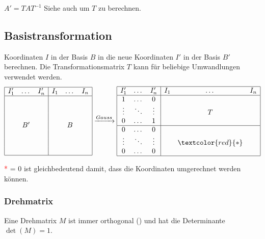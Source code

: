 \noindent $A' = TAT^{-1}$ Siehe auch  um $T$ zu berechnen. 

\subsection{Basistransformation}\label{basistransformation}
\noindent Koordinaten $I$ in der Basis $B$ in die neue Koordinaten $I'$ in der Basis $B'$ berechnen. Die Transformationsmatrix $T$ kann für beliebige Umwandlungen verwendet werden.
\[
\begin{array}{|ccc|ccc|}
	\hline
	I'_1 & \dots & I'_n & I_1 & \dots & I_n \\
	\hline
	& & & & &\\
	& & & & &\\
	& & & & &\\
	& B' & & & B &\\
	& & & & &\\
	& & & & &\\
	& & & & &\\
	\hline
\end{array}
\xrightarrow{Gauss}
\begin{array}{|ccc|ccc|}
	\hline
	I'_1 & \dots & I'_n & I_1 & \dots & I_n \\
	\hline
	1 & \dots & 0 & & &\\
	\vdots & \ddots & \vdots & & T  &\\
	0 & \dots & 1 & & & \\ \hline
	0 & \dots & 0 & & &\\
	\vdots & \ddots & \vdots & & \textcolor{red}{*}  &\\
	0 & \dots & 0 & & & \\
	\hline
\end{array}
\]

\noindent\textcolor{red}{*} = 0 ist gleichbedeutend damit, dass die Koordinaten umgerechnet werden können.

\subsubsection{Drehmatrix}
Eine Drehmatrix $M$ ist immer orthogonal () und hat die Determinante $\det(M) = 1$.\\

